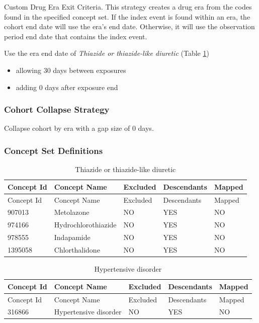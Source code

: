 \documentclass[11pt]{book}
\providecommand{\tightlist}{%
  \setlength{\itemsep}{0pt}\setlength{\parskip}{0pt}}
\theoremstyle{definition}
\theoremstyle{definition}
\theoremstyle{definition}
\theoremstyle{remark}
\begin{document}
Custom Drug Era Exit Criteria. This strategy creates a drug era from the
codes found in the specified concept set. If the index event is found
within an era, the cohort end date will use the era's end date.
Otherwise, it will use the observation period end date that contains the
index event.

Use the era end date of \emph{Thiazide or thiazide-like diuretic} (Table
\ref{tab:thiazidesMono})

\begin{itemize}
\tightlist
\item
  allowing 30 days between exposures
\item
  adding 0 days after exposure end
\end{itemize}

\subsubsection*{Cohort Collapse
Strategy}\label{cohort-collapse-strategy-4}

Collapse cohort by era with a gap size of 0 days.

\subsubsection*{Concept Set
Definitions}\label{concept-set-definitions-4}

\begin{longtable}[]{@{}lllll@{}}
\caption{\label{tab:thiazidesMono} Thiazide or thiazide-like
diuretic}\tabularnewline
\toprule
Concept Id & Concept Name & Excluded & Descendants &
Mapped\tabularnewline
\midrule
\endfirsthead
\toprule
Concept Id & Concept Name & Excluded & Descendants &
Mapped\tabularnewline
\midrule
\endhead
907013 & Metolazone & NO & YES & NO\tabularnewline
974166 & Hydrochlorothiazide & NO & YES & NO\tabularnewline
978555 & Indapamide & NO & YES & NO\tabularnewline
1395058 & Chlorthalidone & NO & YES & NO\tabularnewline
\bottomrule
\end{longtable}

\begin{longtable}[]{@{}lllll@{}}
\caption{\label{tab:hypertensionThzMono} Hypertensive
disorder}\tabularnewline
\toprule
Concept Id & Concept Name & Excluded & Descendants &
Mapped\tabularnewline
\midrule
\endfirsthead
\toprule
Concept Id & Concept Name & Excluded & Descendants &
Mapped\tabularnewline
\midrule
\endhead
316866 & Hypertensive disorder & NO & YES & NO\tabularnewline
\bottomrule
\end{longtable}
\end{document}
